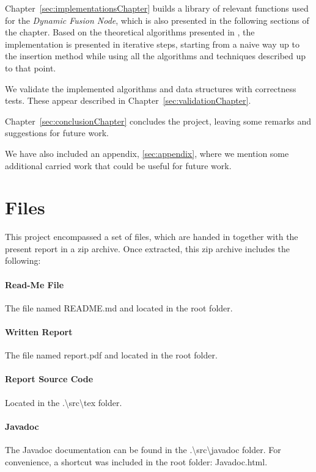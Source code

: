 Chapter~\ref{sec:implementationsChapter} builds a library of relevant functions used for the \textit{Dynamic Fusion Node}, which is also presented in the following sections of the chapter.
Based on the theoretical algorithms presented in \cite{patrascu2014dynamic}, the implementation is presented in iterative steps, starting from a naive way up to the insertion method while using all the algorithms and techniques described up to that point.

We validate the implemented algorithms and data structures with correctness tests. These appear described in Chapter~\ref{sec:validationChapter}.

Chapter~\ref{sec:conclusionChapter} concludes the project, leaving some remarks and suggestions for future work.

We have also included an appendix, \ref{sec:appendix}, where we mention some additional carried work that could be useful for future work.

\section{Files}

This project encompassed a set of files, which are handed in together with the present report in a {\ttfamily zip} archive.
Once extracted, this  {\ttfamily zip} archive includes the following:

\paragraph*{Read-Me File} The file named {\ttfamily README.md} and located in the root folder.

\paragraph*{Written Report} The file named {\ttfamily report.pdf} and located in the root folder.
    
\paragraph*{Report Source Code} Located in the {\ttfamily .\textbackslash src\textbackslash tex} folder.
    
\paragraph*{Javadoc} The {\ttfamily Javadoc} documentation can be found in the {\ttfamily .\textbackslash src\textbackslash javadoc} folder. For convenience, a shortcut was included in the root folder: {\ttfamily Javadoc.html}.

